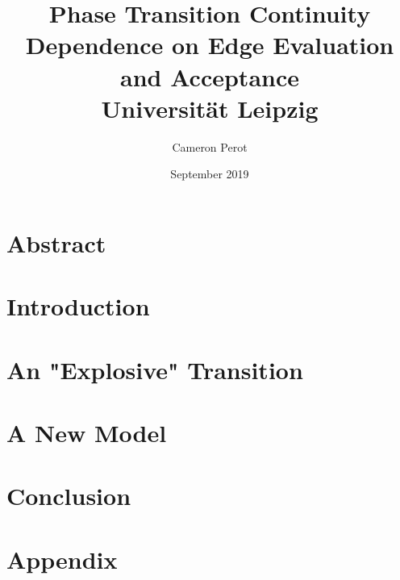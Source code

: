 \documentclass[12pt,twoside]{report}
\title{
    {Phase Transition Continuity Dependence on Edge Evaluation and Acceptance}\\
    {\large Universität Leipzig}
    }
\author{Cameron Perot}
\date{September 2019}
\begin{document}
\maketitle
{}

\chapter*{Abstract}

\tableofcontents
\cleardoublepage
{}

\chapter{Introduction}


\chapter{An "Explosive" Transition}


\chapter{A New Model}


\chapter{Conclusion}


\appendix
\chapter{Appendix}
\label{ch:appendix}


\printbibliography
\end{document}
